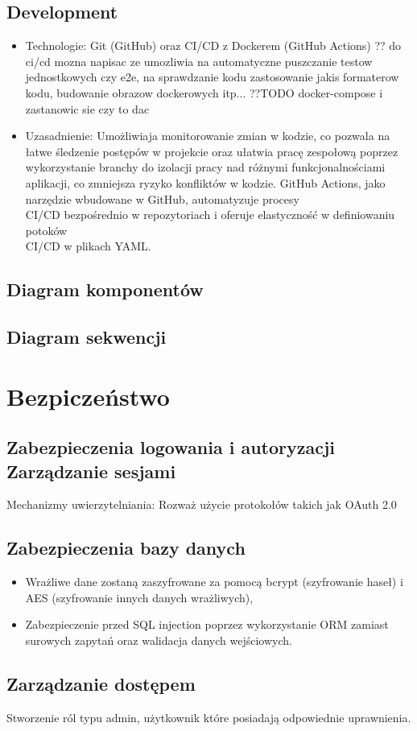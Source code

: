 \documentclass[12pt,titlepage]{article}
\begin{document}
\subsection{Development}
\begin{itemize}
    \item Technologie: Git (GitHub) oraz CI/CD z Dockerem (GitHub Actions) ?? do ci/cd mozna napisac ze umozliwia na automatyczne puszczanie testow jednostkowych czy e2e, na sprawdzanie kodu zastosowanie jakis formaterow kodu, budowanie obrazow dockerowych itp... ??TODO docker-compose i zastanowic sie czy to dac
    \item Uzasadnienie: Umożliwiaja monitorowanie zmian w kodzie, co pozwala na łatwe śledzenie postępów w projekcie oraz ułatwia pracę zespołową poprzez wykorzystanie branchy do izolacji pracy nad różnymi funkcjonalnościami aplikacji, co zmniejsza ryzyko konfliktów w kodzie. GitHub Actions, jako narzędzie wbudowane w GitHub, automatyzuje procesy \\ CI/CD bezpośrednio w repozytoriach i oferuje elastyczność w definiowaniu potoków \\ CI/CD w plikach YAML. 
\end{itemize}


\subsection{Diagram komponentów}
\subsection{Diagram sekwencji}
\section{Bezpiczeństwo}
\subsection{Zabezpieczenia logowania i autoryzacji Zarządzanie sesjami}
Mechanizmy uwierzytelniania: Rozważ użycie protokołów takich jak OAuth 2.0
\subsection{Zabezpieczenia bazy danych}
\begin{itemize}
    \item Wrażliwe dane zostaną zaszyfrowane za pomocą bcrypt (szyfrowanie haseł) i AES (szyfrowanie innych danych wrażliwych),
    \item Zabezpieczenie przed SQL injection poprzez wykorzystanie ORM zamiast surowych zapytań oraz walidacja danych wejściowych.
\end{itemize}

\subsection{Zarządzanie dostępem}
Stworzenie ról typu admin, użytkownik które posiadają odpowiednie uprawnienia.
\end{document}

